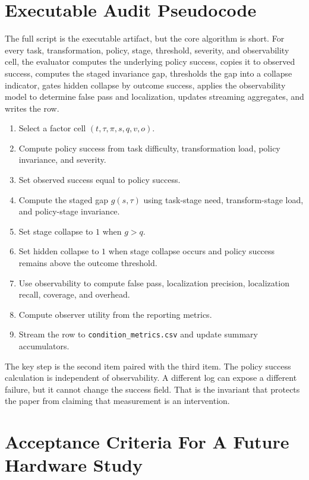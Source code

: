 \documentclass{article}
\newcommand{\auditgap}{g}
\newcommand{\policy}{\pi}
\newcommand{\stage}{s}
\newcommand{\transform}{\tau}
\newcommand{\obs}{o}
\begin{document}
\section{Executable Audit Pseudocode}

The full script is the executable artifact, but the core algorithm is short. For every task, transformation, policy, stage, threshold, severity, and observability cell, the evaluator computes the underlying policy success, copies it to observed success, computes the staged invariance gap, thresholds the gap into a collapse indicator, gates hidden collapse by outcome success, applies the observability model to determine false pass and localization, updates streaming aggregates, and writes the row.

\begin{enumerate}
    \item Select a factor cell $(t,\transform,\policy,\stage,q,v,\obs)$.
    \item Compute policy success from task difficulty, transformation load, policy invariance, and severity.
    \item Set observed success equal to policy success.
    \item Compute the staged gap $\auditgap(\stage,\transform)$ using task-stage need, transform-stage load, and policy-stage invariance.
    \item Set stage collapse to $1$ when $\auditgap > q$.
    \item Set hidden collapse to $1$ when stage collapse occurs and policy success remains above the outcome threshold.
    \item Use observability to compute false pass, localization precision, localization recall, coverage, and overhead.
    \item Compute observer utility from the reporting metrics.
    \item Stream the row to \texttt{condition\_metrics.csv} and update summary accumulators.
\end{enumerate}

The key step is the second item paired with the third item. The policy success calculation is independent of observability. A different log can expose a different failure, but it cannot change the success field. That is the invariant that protects the paper from claiming that measurement is an intervention.

\section{Acceptance Criteria For A Future Hardware Study}
\end{document}

